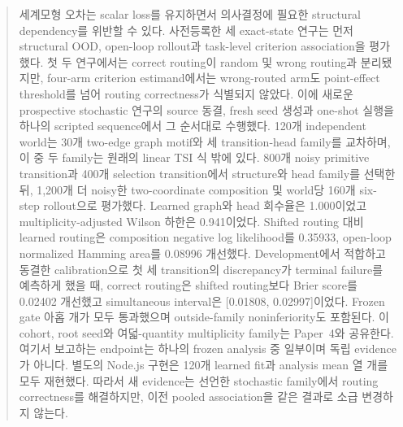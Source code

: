 \begin{abstract}
세계모형 오차는 scalar loss를 유지하면서 의사결정에 필요한 structural
dependency를 위반할 수 있다. 사전등록한 세 exact-state 연구는 먼저 structural
OOD, open-loop rollout과 task-level criterion association을 평가했다. 첫 두
연구에서는 correct routing이 random 및 wrong routing과 분리됐지만, four-arm
criterion estimand에서는 wrong-routed arm도 point-effect threshold를 넘어 routing
correctness가 식별되지 않았다. 이에 새로운 prospective stochastic 연구의 source
동결, fresh seed 생성과 one-shot 실행을 하나의 scripted sequence에서 그 순서대로
수행했다. 120개 independent world는 30개 two-edge
graph motif와 세 transition-head family를 교차하며, 이 중 두 family는 원래의
linear TSI 식 밖에 있다. 800개 noisy primitive transition과 400개 selection
transition에서 structure와 head family를 선택한 뒤, 1,200개 더 noisy한
two-coordinate composition 및 world당 160개 six-step rollout으로 평가했다.
Learned graph와 head 회수율은 1.000이었고 multiplicity-adjusted Wilson 하한은
0.941이었다. Shifted routing 대비 learned routing은 composition negative log
likelihood를 0.35933, open-loop normalized Hamming area를 0.08996 개선했다.
Development에서 적합하고 동결한 calibration으로 첫 세 transition의 discrepancy가
terminal failure를 예측하게 했을 때, correct routing은 shifted routing보다 Brier
score를 0.02402 개선했고 simultaneous interval은 [0.01808, 0.02997]이었다. Frozen
gate 아홉 개가 모두 통과했으며 outside-family noninferiority도 포함된다. 이 cohort,
root seed와 여덟-quantity multiplicity family는 Paper~4와 공유한다. 여기서 보고하는
endpoint는 하나의 frozen analysis 중 일부이며 독립 evidence가 아니다. 별도의
Node.js 구현은 120개 learned fit과 analysis mean 열 개를 모두 재현했다. 따라서
새 evidence는 선언한 stochastic family에서 routing correctness를 해결하지만,
이전 pooled association을 같은 결과로 소급 변경하지 않는다.
\end{abstract}
